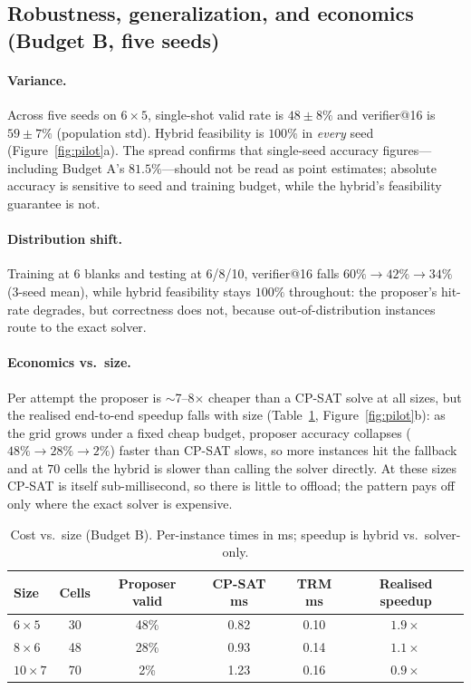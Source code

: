\documentclass{article}
\begin{document}
\subsection{Robustness, generalization, and economics (Budget B, five seeds)}
\label{sec:pilot}

\paragraph{Variance.} Across five seeds on $6\times5$, single-shot valid rate is
$48\pm8\%$ and verifier@16 is $59\pm7\%$ (population std). Hybrid feasibility is
$100\%$ in \emph{every} seed (Figure~\ref{fig:pilot}a). The spread confirms that
single-seed accuracy figures---including Budget A's $81.5\%$---should not be read as
point estimates; absolute accuracy is sensitive to seed and training budget, while
the hybrid's feasibility guarantee is not.

\paragraph{Distribution shift.} Training at 6 blanks and testing at 6/8/10,
verifier@16 falls $60\%\to42\%\to34\%$ (3-seed mean), while hybrid feasibility
stays $100\%$ throughout: the proposer's hit-rate degrades, but correctness does
not, because out-of-distribution instances route to the exact solver.

\paragraph{Economics vs.\ size.} Per attempt the proposer is $\sim$7--8$\times$
cheaper than a CP-SAT solve at all sizes, but the realised end-to-end speedup
falls with size (Table~\ref{tab:econ}, Figure~\ref{fig:pilot}b): as the grid grows
under a fixed cheap budget, proposer accuracy collapses ($48\%\to28\%\to2\%$)
faster than CP-SAT slows, so more instances hit the fallback and at $70$ cells the
hybrid is slower than calling the solver directly. At these sizes CP-SAT is itself
sub-millisecond, so there is little to offload; the pattern pays off only where the
exact solver is expensive.

\begin{table}[h]
\centering
\caption{Cost vs.\ size (Budget B). Per-instance times in ms; speedup is
hybrid vs.\ solver-only.}
\label{tab:econ}
\begin{tabular}{lccccc}
\toprule
Size & Cells & Proposer valid & CP-SAT ms & TRM ms & Realised speedup \\
\midrule
$6\times5$ & 30 & 48\% & 0.82 & 0.10 & $1.9\times$ \\
$8\times6$ & 48 & 28\% & 0.93 & 0.14 & $1.1\times$ \\
$10\times7$ & 70 & \phantom{0}2\% & 1.23 & 0.16 & $0.9\times$ \\
\bottomrule
\end{tabular}
\end{table}
\end{document}
